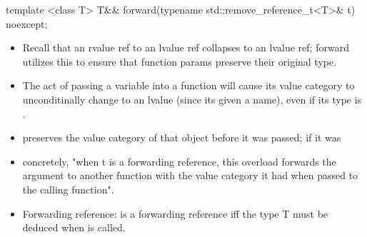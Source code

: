 \begin{cppcode}
template <class T>
T&& forward(typename std::remove_reference_t<T>& t) noexcept;
\end{cppcode}
\begin{itemize}
  \item Recall that an rvalue ref to an lvalue ref collapses to an lvalue ref; forward utilizes this to ensure that function params preserve their original type.
  \item The act of passing a variable into a function will cause its value category to unconditinally change to an lvalue (since its given a name), even if its type is .
  \item {} preserves the value category of that object before it was passed; if it was 
  \item concretely, "when t is a forwarding reference, this overload forwards the argument to another function with the value category it had when passed to the calling function".
  \item Forwarding reference:  is a forwarding reference iff the type T must be deduced when  is called.
\end{itemize}

